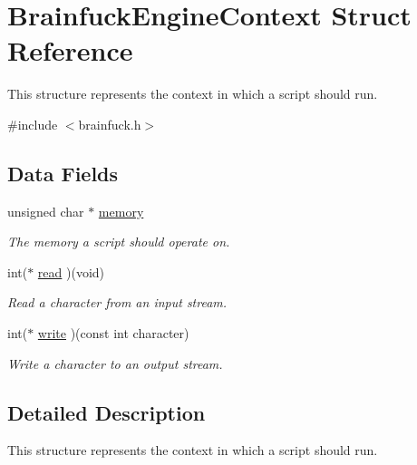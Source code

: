 \hypertarget{structBrainfuckEngineContext}{}\section{Brainfuck\+Engine\+Context Struct Reference}
\label{structBrainfuckEngineContext}


This structure represents the context in which a script should run.  




{\ttfamily \#include $<$brainfuck.\+h$>$}

\subsection*{Data Fields}
\begin{DoxyCompactItemize}
\item 
\hypertarget{structBrainfuckEngineContext_a7bf6001cbe5b1c2cf1635753f3cc5e54}{}unsigned char $\ast$ \hyperlink{structBrainfuckEngineContext_a7bf6001cbe5b1c2cf1635753f3cc5e54}{memory}\label{structBrainfuckEngineContext_a7bf6001cbe5b1c2cf1635753f3cc5e54}

\begin{DoxyCompactList}\small\item\em The memory a script should operate on. \end{DoxyCompactList}\item 
int($\ast$ \hyperlink{structBrainfuckEngineContext_a6b4909f710378c98e9b984afc78b9099}{read} )(void)
\begin{DoxyCompactList}\small\item\em Read a character from an input stream. \end{DoxyCompactList}\item 
int($\ast$ \hyperlink{structBrainfuckEngineContext_a8495230add7edb7d8f87bd1ef9771239}{write} )(const int character)
\begin{DoxyCompactList}\small\item\em Write a character to an output stream. \end{DoxyCompactList}\end{DoxyCompactItemize}


\subsection{Detailed Description}
This structure represents the context in which a script should run. 

